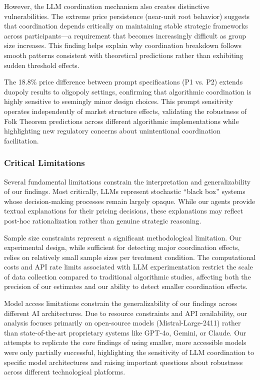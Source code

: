 However, the LLM coordination mechanism also creates distinctive vulnerabilities. The extreme price persistence (near-unit root behavior) suggests that coordination depends critically on maintaining stable strategic frameworks across participants—a requirement that becomes increasingly difficult as group size increases. This finding helps explain why coordination breakdown follows smooth patterns consistent with theoretical predictions rather than exhibiting sudden threshold effects.

The 18.8\% price difference between prompt specifications (P1 vs. P2) extends \textcite{fish_algorithmic_2025} duopoly results to oligopoly settings, confirming that algorithmic coordination is highly sensitive to seemingly minor design choices. This prompt sensitivity operates independently of market structure effects, validating the robustness of Folk Theorem predictions across different algorithmic implementations while highlighting new regulatory concerns about unintentional coordination facilitation.

\subsubsection*{Critical Limitations}

Several fundamental limitations constrain the interpretation and generalizability of our findings. Most critically, LLMs represent stochastic \enquote{black box} systems whose decision-making processes remain largely opaque. While our agents provide textual explanations for their pricing decisions, these explanations may reflect post-hoc rationalization rather than genuine strategic reasoning.

Sample size constraints represent a significant methodological limitation. Our experimental design, while sufficient for detecting major coordination effects, relies on relatively small sample sizes per treatment condition. The computational costs and API rate limits associated with LLM experimentation restrict the scale of data collection compared to traditional algorithmic studies, affecting both the precision of our estimates and our ability to detect smaller coordination effects.

Model access limitations constrain the generalizability of our findings across different AI architectures. Due to resource constraints and API availability, our analysis focuses primarily on open-source models (Mistral-Large-2411) rather than state-of-the-art proprietary systems like GPT-4o, Gemini, or Claude. Our attempts to replicate the core findings of \textcite{fish_algorithmic_2025} using smaller, more accessible models were only partially successful, highlighting the sensitivity of LLM coordination to specific model architectures and raising important questions about robustness across different technological platforms.

